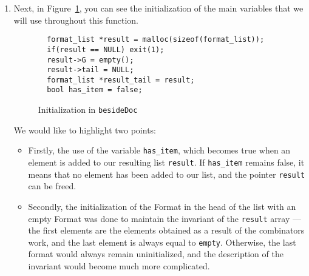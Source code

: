 \documentclass[14pt]{constructor-diploma}
\begin{document}
\begin{enumerate}
  \item Next, in Figure~\ref{fig:beside_doc_initialization}, you can see the initialization of the main variables that we will use throughout this function. 
\begin{figure}[H]
\begin{mdframed}[backgroundcolor=bg]
\begin{verbatim}
  format_list *result = malloc(sizeof(format_list));
  if(result == NULL) exit(1);
  result->G = empty();
  result->tail = NULL;
  format_list *result_tail = result;
  bool has_item = false;
\end{verbatim}
\end{mdframed}
\caption{Initialization in \texttt{besideDoc}}
\label{fig:beside_doc_initialization}
\end{figure}
  We would like to highlight two points:
  \begin{itemize}
    \item Firstly, the use of the variable \texttt{has\_item}, which becomes true when an element is added to our resulting list \texttt{result}. 
    If \texttt{has\_item} remains false, it means that no element has been added to our list, and the pointer \texttt{result} can be freed.
    \item Secondly, the initialization of the Format in the head of the list with an empty Format was done to maintain the invariant of the \texttt{result} array --- 
    the first elements are the elements obtained as a result of the combinators work, and the last element is always equal to \texttt{empty}. Otherwise, the last format would always remain uninitialized, 
    and the description of the invariant would become much more complicated.
  \end{itemize}


\end{enumerate}
\end{document}
